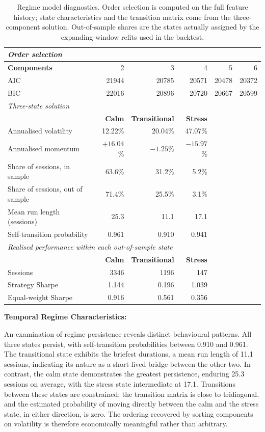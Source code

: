 \begin{table}[!ht]
\centering
\caption{Regime model diagnostics. Order selection is computed on the full feature
history; state characteristics and the transition matrix come from the three-component
solution. Out-of-sample shares are the states actually assigned by the expanding-window
refits used in the backtest.}
\label{tab:regimefit}
\footnotesize
\begin{tabular}{p{3.2cm}rrrrr}
\hline
\multicolumn{6}{l}{\textit{Order selection}} \\
\hline
\textbf{Components} & 2 & 3 & 4 & 5 & 6 \\
AIC & 21944 & 20785 & 20571 & 20478 & 20372 \\
BIC & 22016 & 20896 & 20720 & 20667 & 20599 \\
\hline
\multicolumn{6}{l}{\textit{Three-state solution}} \\
\hline
& \textbf{Calm} & \textbf{Transitional} & \textbf{Stress} & & \\
Annualised volatility & 12.22\% & 20.04\% & 47.07\% & & \\
Annualised momentum & $+16.04$\% & $-1.25$\% & $-15.97$\% & & \\
Share of sessions, in sample & 63.6\% & 31.2\% & 5.2\% & & \\
Share of sessions, out of sample & 71.4\% & 25.5\% & 3.1\% & & \\
Mean run length (sessions) & 25.3 & 11.1 & 17.1 & & \\
Self-transition probability & 0.961 & 0.910 & 0.941 & & \\
\hline
\multicolumn{6}{l}{\textit{Realised performance within each out-of-sample state}} \\
\hline
& \textbf{Calm} & \textbf{Transitional} & \textbf{Stress} & & \\
Sessions & 3346 & 1196 & 147 & & \\
Strategy Sharpe & 1.144 & 0.196 & 1.039 & & \\
Equal-weight Sharpe & 0.916 & 0.561 & 0.356 & & \\
\hline
\end{tabular}
\end{table}

\textbf{Temporal Regime Characteristics:}

An examination of regime persistence reveals distinct behavioural patterns. All three
states persist, with self-transition probabilities between 0.910 and 0.961. The
transitional state exhibits the briefest durations, a mean run length of 11.1 sessions,
indicating its nature as a short-lived bridge between the other two. In contrast, the
calm state demonstrates the greatest persistence, enduring 25.3 sessions on average, with
the stress state intermediate at 17.1. Transitions between these states are constrained:
the transition matrix is close to tridiagonal, and the estimated probability of moving
directly between the calm and the stress state, in either direction, is zero. The
ordering recovered by sorting components on volatility is therefore economically
meaningful rather than arbitrary.

